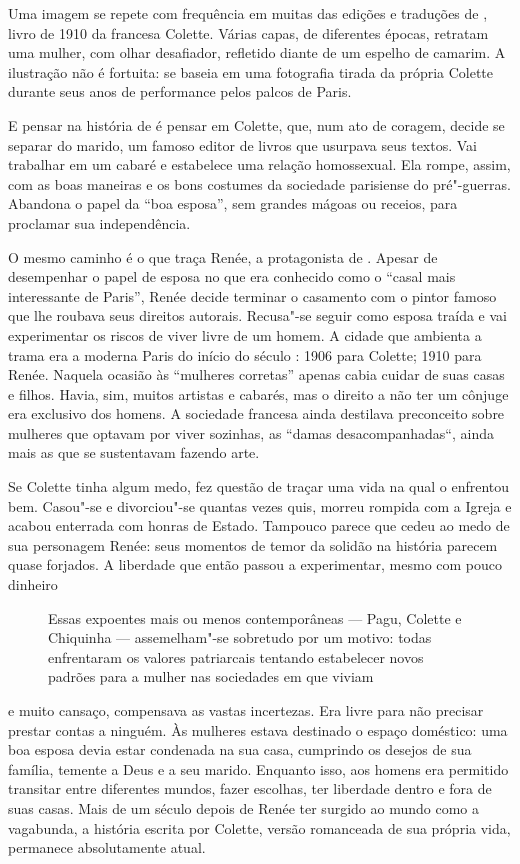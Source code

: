 \begin{multicols}{2}
Uma imagem se repete com frequência em muitas das edições e traduções de {}, livro de 1910 da francesa Colette. Várias capas, de diferentes épocas, retratam uma mulher, com olhar desafiador, refletido diante de um espelho de camarim. A ilustração não é fortuita: se baseia em uma fotografia tirada da própria Colette durante seus anos de performance pelos palcos de Paris. 

E pensar na história de {} é pensar em Colette, que, num ato de coragem, decide se separar do marido, um famoso editor de livros que usurpava seus textos. Vai trabalhar em um cabaré e estabelece uma relação homossexual. Ela rompe, assim, com as boas maneiras e os bons costumes da sociedade parisiense do pré"-guerras. Abandona o papel da “boa esposa”, sem grandes mágoas ou receios, para proclamar sua independência.

O mesmo caminho é o que traça Renée, a protagonista de {}. Apesar de desempenhar o papel de esposa no que era conhecido como o “casal mais interessante de Paris”, Renée decide terminar o casamento com o pintor famoso que lhe roubava seus direitos autorais. Recusa"-se seguir como esposa traída e vai experimentar os riscos de viver livre de um homem. A cidade que ambienta a trama era a moderna Paris do início do século : 1906 para Colette; 1910 para Renée. Naquela ocasião às “mulheres corretas” apenas cabia cuidar de suas casas e filhos. Havia, sim, muitos artistas e cabarés, mas o direito a não ter um cônjuge era exclusivo dos homens. A sociedade francesa ainda destilava preconceito sobre mulheres que optavam por viver sozinhas, as “damas desacompanhadas“, ainda mais as que se sustentavam fazendo arte.

Se Colette tinha algum medo, fez questão de traçar uma vida na qual o enfrentou bem. Casou"-se e divorciou"-se quantas vezes quis, morreu rompida com a Igreja e acabou enterrada com honras de Estado. Tampouco parece que cedeu ao medo de sua personagem Renée: seus momentos de temor da solidão na história parecem quase forjados. A liberdade que então passou a experimentar, mesmo com pouco dinheiro
\begin{figure}
{\large
Essas expoentes mais ou menos contemporâneas --- Pagu, Colette e Chiquinha --- assemelham"-se sobretudo por um motivo: todas enfrentaram os valores patriarcais tentando estabelecer novos padrões para a mulher nas sociedades em que viviam
}
\end{figure}
e muito cansaço, compensava as vastas incertezas. Era livre para não precisar prestar contas a ninguém. Às mulheres estava destinado o espaço doméstico: uma boa esposa devia estar condenada na sua casa, cumprindo os desejos de sua família, temente a Deus e a seu marido. Enquanto isso, aos homens era permitido transitar entre diferentes mundos, fazer escolhas, ter liberdade dentro e fora de suas casas. Mais de um século depois de Renée ter surgido ao mundo como a vagabunda, a história escrita por Colette, versão romanceada de sua própria vida, permanece absolutamente atual.


\end{multicols}
